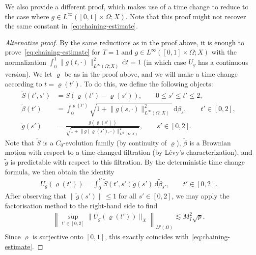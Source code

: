 \documentclass[11pt]{amsart}
\theoremstyle{definition}
\theoremstyle{remark}
\numberwithin{equation}{section}
\newcommand{\1}{\mathbf 1}
\newcommand{\norm}[1]{\lVert #1\rVert}
\newcommand{\dd}{\,\mathrm d}
\begin{document}
We also provide a different proof, which makes use of a time change to reduce to the case where $g \in L^{\infty}([0,1]\times \Omega ;X)$. Note that this proof might not recover the same constant in~\eqref{eq:chaining-estimate}.

\begin{proof}[Alternative proof]
By the same reductions as in the proof above, it is enough to prove~\eqref{eq:chaining-estimate} for $T = 1$ and $g\in L^\infty([0,1]\times \Omega;X)$ with the normalization $\int_0^1 \|g(t,\cdot)\|_{L^\infty(\Omega;X)}^2 \dd t = 1$ (in which case $U_g$ has a continuous version).
We let $\varrho$ be as in the proof above, and we will make a time change according to $t = \varrho(t')$.
To do this, we define the following objects:
\begin{align*}
    \widetilde{S}(t',s') &= S(\varrho(t') - \varrho(s')),  \qquad 0 \leq s' \leq t' \leq 2,\\
    \widetilde{\beta}(t') &= \int_0^{\varrho(t')}\sqrt{1 + \norm{g(s,\cdot)}_{L^{\infty}(\Omega;X)}^2} \dd \beta_s, \qquad t' \in [0,2], \\
    \widetilde{g}(s') &= \frac{g(\varrho(s'))}{\sqrt{1 + \norm{g(\varrho(s'),\cdot)}_{L^{\infty}(\Omega;X)}^2}}, \qquad s' \in [0,2].
\end{align*}
Note that $\widetilde{S}$ is a $C_0$-evolution family (by continuity of $\varrho$), $\widetilde{\beta}$ is a Brownian motion with respect to a time-changed filtration (by L\'evy's characterization), and $\tilde{g}$ is predictable with respect to this filtration.
By the deterministic time change formula, we then obtain the identity
\begin{align*}
    U_g(\varrho(t')) = \int_0^{t'}\widetilde{S}(t',s')\widetilde{g}(s') \dd \widetilde{\beta}_{s'}, \qquad t' \in [0,2].
\end{align*}
After observing that $\norm{\tilde{g}(s')} \leq 1$ for all $s' \in [0,2]$, we may apply the factorisation method \cite{Seidler1993} to the right-hand side to find
\begin{align}
    \left\lVert \sup_{t' \in [0,2]} \norm{U_g(\varrho(t'))}_{X}\right\rVert_{L^p(\Omega)} \lesssim M_I^2 \sqrt{p}.
\end{align}
Since $\varrho$ is surjective onto $[0,1]$, this exactly coincides with~\eqref{eq:chaining-estimate}. \qedhere

\end{proof}
\end{document}
